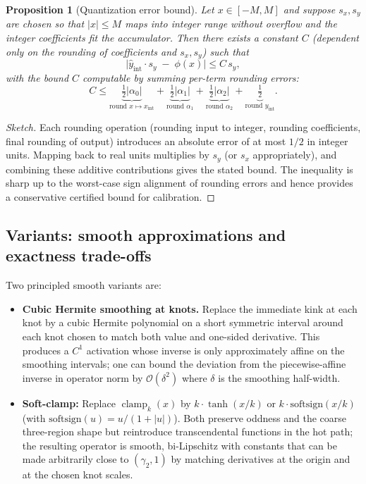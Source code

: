 \documentclass[11pt, twoside, openright, english]{article}
\DeclareMathOperator{\clamp}{clamp}
\numberwithin{equation}{section}
\theoremstyle{plain}
\newtheorem{proposition}[theorem]{Proposition}
\theoremstyle{definition}
\theoremstyle{remark}
\begin{document}
\begin{proposition}[Quantization error bound]
Let $x\in[-M,M]$ and suppose $s_x,s_y$ are chosen so that $|x|\le M$ maps into integer range without overflow and the integer coefficients fit the accumulator. Then there exists a constant $C$ (dependent only on the rounding of coefficients and $s_x,s_y$) such that
\[
\big| \widehat y_{\mathrm{int}} \cdot s_y \;-\; \phi(x) \big| \le C\,s_y,
\]
with the bound $C$ computable by summing per-term rounding errors:
\[
C \le \underbrace{\tfrac12 |\alpha_0|}_{\text{round }x\mapsto x_{\mathrm{int}}} 
+ \underbrace{\tfrac12|\alpha_1|}_{\text{round }\alpha_1}
+ \underbrace{\tfrac12|\alpha_2|}_{\text{round }\alpha_2}
+ \underbrace{\tfrac12}_{\text{round }y_{\mathrm{int}}}.
\]
\end{proposition}
\begin{proof}[Sketch]
Each rounding operation (rounding input to integer, rounding coefficients, final rounding of output) introduces an absolute error of at most $1/2$ in integer units. Mapping back to real units multiplies by $s_y$ (or $s_x$ appropriately), and combining these additive contributions gives the stated bound. The inequality is sharp up to the worst-case sign alignment of rounding errors and hence provides a conservative certified bound for calibration.
\end{proof}

\subsection{Variants: smooth approximations and exactness trade-offs}
Two principled smooth variants are:

\begin{itemize}
  \item \textbf{Cubic Hermite smoothing at knots.} Replace the immediate kink at each knot by a cubic Hermite polynomial on a short symmetric interval around each knot chosen to match both value and one-sided derivative. This produces a $C^1$ activation whose inverse is only approximately affine on the smoothing intervals; one can bound the deviation from the piecewise-affine inverse in operator norm by $\mathcal{O}(\delta^2)$ where $\delta$ is the smoothing half-width.
  \item \textbf{Soft-clamp:} Replace $\clamp_k(x)$ by $k\cdot \tanh(x/k)$ or $k\cdot\mathrm{softsign}(x/k)$ (with $\mathrm{softsign}(u)=u/(1+|u|)$). Both preserve oddness and the coarse three-region shape but reintroduce transcendental functions in the hot path; the resulting operator is smooth, bi-Lipschitz with constants that can be made arbitrarily close to $(\gamma_2,1)$ by matching derivatives at the origin and at the chosen knot scales.
\end{itemize}
\end{document}
